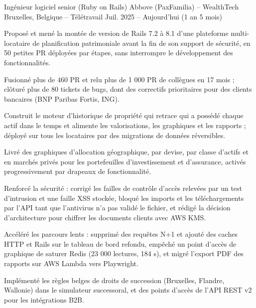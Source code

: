 
\begin{cventries}

\cventry
  {Ingénieur logiciel senior (Ruby on Rails)}
  {Abbove (PaxFamilia) – WealthTech}
  {Bruxelles, Belgique – Télétravail}
  {Juil. 2025 – Aujourd'hui (1 an 5 mois)}
  {
    \begin{cvitems}
      \item {Proposé et mené la montée de version de Rails 7.2 à 8.1 d'une plateforme multi-locataire de planification patrimoniale avant la fin de son support de sécurité, en 50 petites PR déployées par étapes, sans interrompre le développement des fonctionnalités.}
      \item {Fusionné plus de 460 PR et relu plus de 1 000 PR de collègues en 17 mois ; clôturé plus de 80 tickets de bugs, dont des correctifs prioritaires pour des clients bancaires (BNP Paribas Fortis, ING).}
      \item {Construit le moteur d'historique de propriété qui retrace qui a possédé chaque actif dans le temps et alimente les valorisations, les graphiques et les rapports ; déployé sur tous les locataires par des migrations de données réversibles.}
      \item {Livré des graphiques d'allocation géographique, par devise, par classe d'actifs et en marchés privés pour les portefeuilles d'investissement et d'assurance, activés progressivement par drapeaux de fonctionnalité.}
      \item {Renforcé la sécurité : corrigé les failles de contrôle d'accès relevées par un test d'intrusion et une faille XSS stockée, bloqué les imports et les téléchargements par l'API tant que l'antivirus n'a pas validé le fichier, et rédigé la décision d'architecture pour chiffrer les documents clients avec AWS KMS.}
      \item {Accéléré les parcours lents : supprimé des requêtes N+1 et ajouté des caches HTTP et Rails sur le tableau de bord refondu, empêché un point d'accès de graphique de saturer Redis (23 000 lectures, 184 s), et migré l'export PDF des rapports sur AWS Lambda vers Playwright.}
      \item {Implémenté les règles belges de droits de succession (Bruxelles, Flandre, Wallonie) dans le simulateur successoral, et des points d'accès de l'API REST v2 pour les intégrations B2B.}
    \end{cvitems}
  }


\end{cventries}
